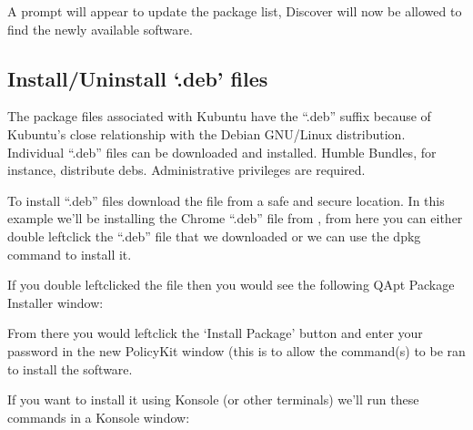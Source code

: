 \documentclass[letterpaper,10pt,english]{sphinxmanual}
\begin{document}
\sphinxAtStartPar
A prompt will appear to update the package list, Discover will now be allowed to find the newly available software.


\subsection{Install/Uninstall ‘.deb’ files}
\label{\detokenize{docs/software-management/repositories:install-uninstall-deb-files}}
\sphinxAtStartPar
The package files associated with Kubuntu have the “.deb” suffix because of Kubuntu’s close relationship with the Debian GNU/Linux distribution. Individual “.deb” files can be downloaded and installed. Humble Bundles, for instance, distribute debs. Administrative privileges are required.

\sphinxAtStartPar
To install “.deb” files download the file from a safe and secure location. In this example we’ll be installing the Chrome “.deb” file from  , from here you can either double left\sphinxhyphen{}click the “.deb” file that we downloaded or we can use the dpkg command to install it.

\sphinxAtStartPar
If you double left\sphinxhyphen{}clicked the file then you would see the following QApt Package Installer window:


\sphinxAtStartPar
From there you would left\sphinxhyphen{}click the ‘Install Package’ button and enter your password in the new PolicyKit window (this is to allow the command(s) to be ran to install the software.


\sphinxAtStartPar
If you want to install it using Konsole (or other terminals) we’ll run these commands in a Konsole window:

\begin{sphinxVerbatim}[commandchars=\\\{\}]
   
   
\end{sphinxVerbatim}
\end{document}
